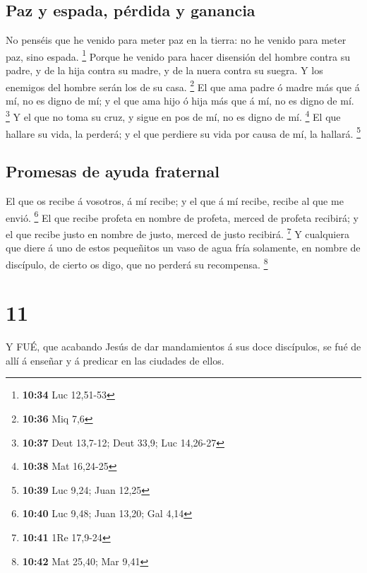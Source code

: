 \hypertarget{paz-y-espada-puxe9rdida-y-ganancia}{%
\subsection{Paz y espada, pérdida y
ganancia}\label{paz-y-espada-puxe9rdida-y-ganancia}}

 No penséis que he venido para meter paz en la tierra: no
he venido para meter paz, sino espada. \footnote{\textbf{10:34} Luc
  12,51-53}  Porque he venido para hacer disensión del
hombre contra su padre, y de la hija contra su madre, y de la nuera
contra su suegra.  Y los enemigos del hombre serán los de
su casa. \footnote{\textbf{10:36} Miq 7,6}  El que ama
padre ó madre más que á mí, no es digno de mí; y el que ama hijo ó hija
más que á mí, no es digno de mí. \footnote{\textbf{10:37} Deut 13,7-12;
  Deut 33,9; Luc 14,26-27}  Y el que no toma su cruz, y
sigue en pos de mí, no es digno de mí. \footnote{\textbf{10:38} Mat
  16,24-25}  El que hallare su vida, la perderá; y el que
perdiere su vida por causa de mí, la hallará. \footnote{\textbf{10:39}
  Luc 9,24; Juan 12,25}

\hypertarget{promesas-de-ayuda-fraternal}{%
\subsection{Promesas de ayuda
fraternal}\label{promesas-de-ayuda-fraternal}}

 El que os recibe á vosotros, á mí recibe; y el que á mí
recibe, recibe al que me envió. \footnote{\textbf{10:40} Luc 9,48; Juan
  13,20; Gal 4,14}  El que recibe profeta en nombre de
profeta, merced de profeta recibirá; y el que recibe justo en nombre de
justo, merced de justo recibirá. \footnote{\textbf{10:41} 1Re 17,9-24}
 Y cualquiera que diere á uno de estos pequeñitos un vaso
de agua fría solamente, en nombre de discípulo, de cierto os digo, que
no perderá su recompensa. \footnote{\textbf{10:42} Mat 25,40; Mar 9,41}

\hypertarget{section-10}{%
\section{11}\label{section-10}}

 Y FUÉ, que acabando Jesús de dar mandamientos á sus doce
discípulos, se fué de allí á enseñar y á predicar en las ciudades de
ellos.

